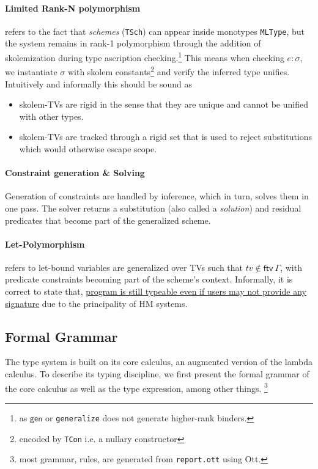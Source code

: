 \documentclass[a4paper, 11pt]{article}
\theoremstyle{remark}\newtheorem*{remark}{Remark}
\theoremstyle{definition}\newtheorem*{definition}{Definition}
\begin{document}
\paragraph{Limited Rank-N polymorphism} refers to the fact that \emph{schemes} (\texttt{TSch}) can
appear inside monotypes \texttt{MLType}, but the system remains in rank-1 polymorphism
through the addition of skolemization during type ascription checking.\footnote{
as \(\mathsf{gen}\) or \texttt{generalize} does not generate higher-rank binders.
}
This means when checking \(e : \sigma\), we instantiate \(\sigma\)  with skolem constants\footnote{
encoded by \texttt{TCon} i.e. a nullary constructor
}
and verify the inferred type unifies. Intuitively and informally this should be sound as
\begin{itemize}
\item skolem-TVs are rigid in the sense that they are unique and cannot be unified with other types.
\item skolem-TVs are tracked through a rigid set that is used to reject substitutions which would
  otherwise escape scope.
\end{itemize}
\paragraph{Constraint generation \& Solving} Generation of constraints are handled by
inference, which in turn, solves them in one pass. The solver returns a substitution (also called a \emph{solution}) and residual
predicates that become part of the generalized scheme.
\paragraph{Let-Polymorphism} refers to let-bound variables are generalized over TVs
such that \(tv\notin\mathsf{ftv}\ \Gamma\), with predicate constraints
becoming part of the scheme's context. Informally, it is correct to state that,
\underline{program is still typeable even if users may not provide any signature} due to
the principality of HM systems.

\subsection{Formal Grammar}

The type system is built on its core calculus, an augmented version of the lambda
calculus. To describe its typing discipline, we first present the formal grammar of
the core calculus as well as the type expression, among other things.
\footnote{most grammar, rules, are generated from \texttt{report.ott} using Ott.}
\end{document}
